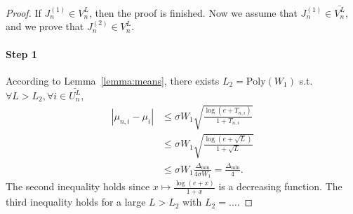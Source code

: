 \begin{proof}
    If $J_n^{(1)} \in V_n^L$, then the proof is finished. Now we assume that $J_n^{(1)} \in \bar{V_n^L}$, and we prove that $J_n^{(2)} \in V_n^L$.
    \paragraph{Step 1} According to Lemma~\ref{lemma:means}, there exists $L_2 = \text{Poly}(W_1)$ s.t. $\forall L > L_2, \forall i \in \bar{U_n^L}$,
    \begin{align*}
        |\mu_{n,i} - \mu_{i}| &\leq \sigma W_1 \sqrt{\frac{\log(e+T_{n,i})}{1+T_{n,i}}}\\
                              &\leq \sigma W_1 \sqrt{\frac{\log(e+\sqrt{L})}{1+\sqrt{L}}}\\
                              &\leq \sigma W_1 \frac{\Delta_{\text{min}}}{4\sigma W_1} = \frac{\Delta_{\text{min}}}{4}.
    \end{align*}
    The second inequality holds since $x\mapsto \frac{\log(e+x)}{1+x}$ is a decreasing function. The third inequality holds for a large $L>L_2$ with $L_2 = \ldots$.
    

\end{proof}
